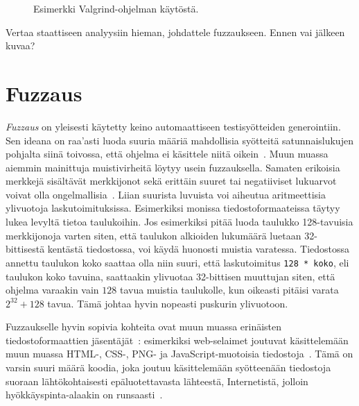 \begin{figure}[H]



\caption{Esimerkki Valgrind-ohjelman käytöstä.}
\label{ValgrindEsimerkki}
\end{figure}

Vertaa staattiseen analyysiin hieman, johdattele fuzzaukseen.
Ennen vai jälkeen kuvaa?

\section{Fuzzaus}
\label{Fuzzaus}

\emph{Fuzzaus} on yleisesti käytetty keino automaattiseen testisyötteiden generointiin.
Sen ideana on raa'asti luoda suuria määriä mahdollisia syötteitä satunnaislukujen pohjalta siinä toivossa,
että ohjelma ei käsittele niitä oikein~\cite{UnixReliability}.
Muun muassa aiemmin mainittuja muistivirheitä löytyy usein fuzzauksella.
Samaten erikoisia merkkejä sisältävät merkkijonot sekä erittäin suuret tai negatiiviset lukuarvot
voivat olla ongelmallisia~\cite{ViolatingAssumptions}.
Liian suurista luvuista voi aiheutua aritmeettisia ylivuotoja laskutoimituksissa.
Esimerkiksi monissa tiedostoformaateissa täytyy lukea levyltä tietoa taulukoihin.
Jos esimerkiksi pitää luoda taulukko 128-tavuisia merkkijonoja varten siten,
että taulukon alkioiden lukumäärä luetaan 32-bittisestä kentästä tiedostossa,
voi käydä huonosti muistia varatessa.
Tiedostossa annettu taulukon koko saattaa olla niin suuri,
että laskutoimitus \texttt{128 * koko}, eli taulukon koko tavuina,
saattaakin ylivuotaa 32-bittisen muuttujan siten,
että ohjelma varaakin vain $128$ tavua muistia taulukolle,
kun oikeasti pitäisi varata $2^{32} + 128$ tavua.
Tämä johtaa hyvin nopeasti puskurin ylivuotoon.

Fuzzaukselle hyvin sopivia kohteita ovat muun muassa erinäisten tiedostoformaattien jäsentäjät~\cite{SageArtikkeli,OuluBrowser}:
esimerkiksi web-selaimet joutuvat käsittelemään muun muassa
HTML-, CSS-, PNG- ja JavaScript-muotoisia tiedostoja~\cite{OuluBrowser}.
Tämä on varsin suuri määrä koodia,
joka joutuu käsittelemään syötteenään tiedostoja suoraan lähtökohtaisesti epäluotettavasta lähteestä, Internetistä,
jolloin hyökkäyspinta-alaakin on runsaasti~\cite{OuluBrowser}.

